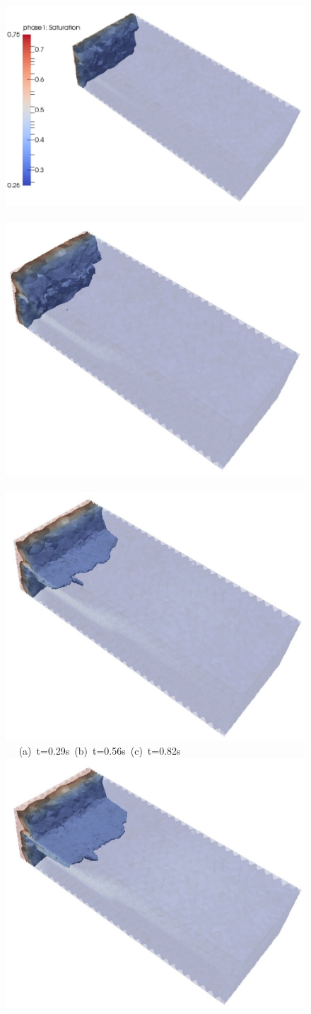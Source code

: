 \begin{landscape}
  \begin{figure}[ht]
  \vbox{\vspace{-.5cm}
      \hbox{\includegraphics[width=.55\textwidth, height=.45\textwidth]{./Pics1/3D_Channel/3D_Channel_Saturation1Isosurface_D30c.pdf} 
            \includegraphics[width=.5\textwidth]{./Pics1/3D_Channel/3D_Channel_Saturation1Isosurface_D60c.pdf}
            \includegraphics[width=.5\textwidth]{./Pics1/3D_Channel/3D_Channel_Saturation1Isosurface_D90c.pdf} }
      \hbox{\hspace{2.0cm} (a) t=0.29s \hspace{6.cm} (b) t=0.56s \hspace{4.cm} (c) t=0.82s}
      \vspace{0.5cm}
      \hbox{\hspace{.5cm} \includegraphics[width=.45\textwidth]{./Pics1/3D_Channel/3D_Channel_Saturation1Isosurface_D110c.pdf}
}}
\end{figure}
\end{landscape}
